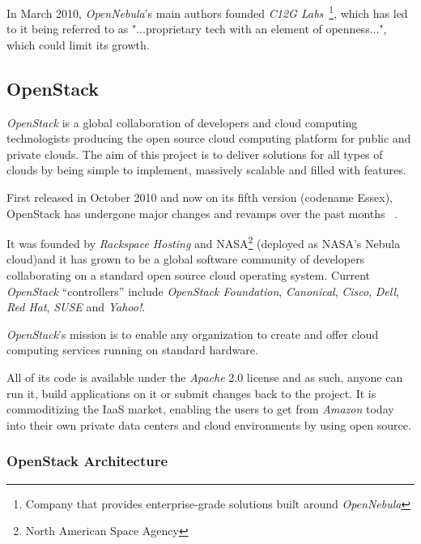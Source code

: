 In March 2010, \textit{OpenNebula}'s main authors founded \textit{C12G Labs}~\footnote{Company that provides enterprise-grade solutions built around \textit{OpenNebula}}, which has led to it being referred to as "...proprietary tech with an element of openness...", which could limit its growth.~\cite{http://www.linkedin.com/groups/OpenStack-vs-Eucalyptus-vs-OpenNebula-2685473.S.54382975}

\subsection{OpenStack}\label{subsec:openstack}

\textit{OpenStack} is a global collaboration of developers and cloud computing technologists producing the open source cloud computing platform for public and private clouds. The aim of this project is to deliver solutions for all types of clouds by being simple to implement, massively scalable and filled with features. 

First released in October 2010 and now on its fifth version (codename Essex), OpenStack has undergone major changes and revamps over the past months ~\cite{openstack}.

It was founded by \textit{Rackspace Hosting} and NASA\footnote{North American Space Agency} (deployed as NASA's Nebula cloud\cite{needs cite})and it has grown to be a global software community of developers collaborating on a standard open source cloud operating system. Current \textit{OpenStack} ``controllers'' include \textit{OpenStack Foundation}, \textit{Canonical}, \textit{Cisco}, \textit{Dell}, \textit{Red Hat}, \textit{SUSE} and \textit{Yahoo!}. \cite{https://github.com/dellcloudedge/crowbar/wiki/OpenStack-Essex-Deploy-Day}

\textit{OpenStack}'s mission is to enable any organization to create and offer cloud computing services running on standard hardware.

All of its code is available under the \textit{Apache} 2.0 license and as such, anyone can run it, build applications on it or submit changes back to the project. It is commoditizing the IaaS market, enabling the users to get from \textit{Amazon} today into their own private data centers and cloud environments by using open source. \cite{https://github.com/dellcloudedge/crowbar/wiki/OpenStack-Essex-Deploy-Day}

\subsubsection{OpenStack Architecture}\label{subsubsec:openstack_arch}
  
